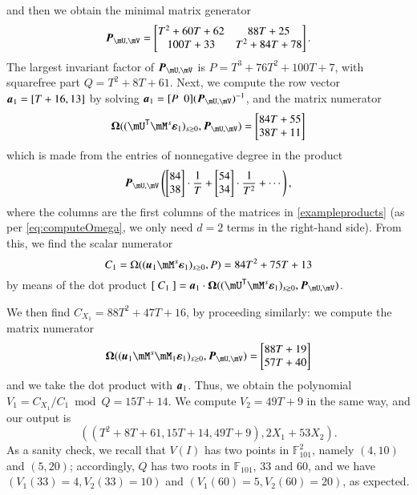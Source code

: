 \documentclass[final,1p,times,authoryear]{elsarticle}
\newcommand{\mat}[1]{\bm{\MakeUppercase{#1}}} %
\newcommand{\row}[1]{\bm{\MakeLowercase{#1}}} %
\newcommand{\col}[1]{\bm{\MakeLowercase{#1}}} %
\newcommand{\minpoly}{P}
\newcommand{\sqfree}{Q}
\newcommand{\trsp}[1]{#1^{\mathsf{T}}} %
\def\F {\ensuremath{\mathbb{F}}}
\newcommand{\mUt}{\trsp{\mU}}
\begin{document}
and then we obtain the minimal matrix generator
\[
  \mat{P}_{\mU,\mV} =
  \begin{bmatrix}
    T^2 + 60T + 62 &       88T + 25\\
    100T + 33 & T^2 + 84T + 78
  \end{bmatrix}.
\]
The largest invariant factor of $\mat{P}_{\mU,\mV}$ is 
$P = T^3 + 76T^2 + 100T + 7$,
with squarefree part $\sqfree=T^2+8T+61$.
Next, we compute the row vector $\row{a}_1 = [T+16,13]$ 
by solving $\row{a}_1 = [P~~0] (\mat{P}_{\mU,\mV})^{-1}$,
and the matrix numerator
\[
  \mat{\Omega}( (\mUt \mM^s\col{\varepsilon}_1)_{s \ge 0}, \mat{P}_{\mU,\mV}) 
  =\left [\begin{matrix} 84T + 55 \\ 38T + 11 \end{matrix}\right ]
\]
which is made from the entries of nonnegative degree in the product
\[\mat{P}_{\mU,\mV} 
  \left (
    \begin{bmatrix}
      84\\  
      38
    \end{bmatrix}\cdot \frac 1T+
    \begin{bmatrix}
      54\\  
      34
    \end{bmatrix}\cdot \frac 1{T^2}+
  \cdots \right),
\]
where the columns are the first columns of the
matrices in \cref{exampleproducts} (as per \cref{eq:computeOmega}, we only need $d=2$
terms in the right-hand side).  From this, we find the scalar
numerator 
\[
  C_1 = \Omega((\row{u}_1 \mM^s\col{\varepsilon}_1)_{s \ge
  0}, \minpoly) = 84T^2 + 75T + 13
\]
by means of the dot product $[~C_1~] = \row{a}_1\cdot
\mat{\Omega}( (\mUt \mM^s\col{\varepsilon}_1)_{s \ge 0},
\mat{P}_{\mU,\mV})$.

We then find $C_{X_1} = 88T^2 + 47T  + 16$, by proceeding similarly: we compute
the matrix numerator
\[
  \mat{\Omega}( (\row{u}_1 \mM^s \mM_1\col{\varepsilon}_1)_{s \ge 0},
  \mat{P}_{\mU,\mV}) = \begin{bmatrix} 88T + 19 \\ 57T+40
  \end{bmatrix}
\]
and we take the dot product with $\row{a}_1$.
Thus, we obtain the polynomial $V_1 = C_{X_1}/C_1 \bmod \sqfree =
15T+14$. 
We compute $V_2= 49T+9$ in the same way,
and our output is 
$$((T^2+8T+61, 15T+14, 49T+9), 2X_1 + 53 X_2).$$ As a sanity check, we
recall that $V( I)$ has two points in $\F_{101}^2$, namely
$(4,10)$ and $(5,20)$; accordingly, $Q$ has two roots in $\F_{101}$,
$33$ and $60$, and we have $(V_1(33) = 4, V_2(33) = 10)$ and $(V_1(60) = 5,
V_2(60) = 20)$, as expected.
\end{document}
